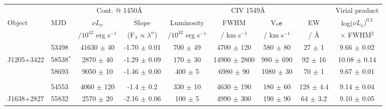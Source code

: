 \begin{table*}
  \small
  \begin{centering}
    \begin{tabular}{l  l | c c | c c c c | c}
      \hline
      \hline
                        &                   &  \multicolumn{2}{c}{Cont. @ 1450\AA }                                           &   \multicolumn{4}{c}{CIV 1549\AA}                                                                          &  Virial product \\
       Object      &   MJD           &       $\nu L_{\nu}$             &         Slope                                               &   Luminosity                &     FWHM               &    V$_{\rm off}$          &          EW        &  log($\nu L_{\nu})^{0.5} $ \\
                       &                     & $/10^{42}$ erg s$^{-1}$ & (F$_\lambda \propto \lambda^\alpha$)    & $/10^{42}$ erg s$^{-1}$ &    / km s$^{-1}$ &  /  km s$^{-1}$         &     /  \AA   & $\times$ FWHM$^{2}$   \\
      \hline
                       &  53498          &   41630   $\pm$   40    &  -1.70 $\pm$ 0.01                               &   700    $\pm$ 49       &  4700 $\pm$  120     &     580    $\pm$   80      &   27  $\pm$  1      &  9.66 $\pm$ 0.02\\
 J1205+3422  &  58538$^*$   &    2870    $\pm$   40     &  -1.29 $\pm$ 0.09                              &  170    $\pm$ 30      & 14900 $\pm$ 2800   &     980    $\pm$  690      &   92    $\pm$    16        & 10.08  $\pm$ 0.14 \\
                       &  58693          &    9050    $\pm$   10     &  -1.46 $\pm$ 0.00                              &  400   $\pm$   5       &  6980 $\pm$   90      &    1080    $\pm$   30      &   70 $\pm$  1  &  9.67 $\pm$ 0.01\\
                       &                      &                                      &                                                             &                                  &                                   &                                       &                                   &                  \\
                       &  54553         &    4060    $\pm$  120    &  -1.4  $\pm$ 0.2                                 & 330      $\pm$ 10      &  4630 $\pm$  190     &     180    $\pm$   60     &  128  $\pm$  4.4   &  9.14 $\pm$ 0.04\\
 J1638+2827   &  55832        &    2570    $\pm$   20      &  -2.16 $\pm$ 0.06                             & 100    $\pm$  5        &  4990 $\pm$  300      &     190    $\pm$   90      &   64  $\pm$  3.2   &  9.10 $\pm$ 0.05\\

\end{tabular}
\end{centering}
\end{table*}
